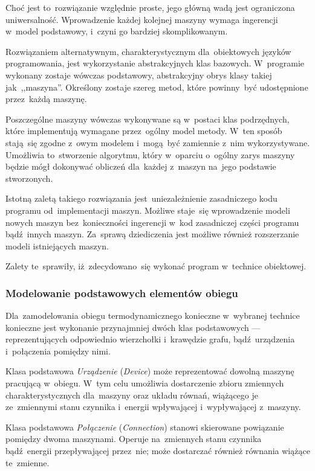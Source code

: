 Choć jest to~rozwiązanie względnie proste, jego główną wadą jest
ograniczona uniwersalność. Wprowadzenie każdej kolejnej maszyny wymaga
ingerencji w~model podstawowy, i~czyni go bardziej skomplikowanym.

Rozwiązaniem alternatywnym, charakterystycznym dla~obiektowych języków
programowania, jest wykorzystanie abstrakcyjnych klas bazowych.
W~programie wykonany zostaje wówczas podstawowy, abstrakcyjny obrys
klasy takiej jak~,,maszyna''. Określony zostaje szereg metod, które
powinny~być udostępnione przez~każdą maszynę.

Poszczególne maszyny wówczas wykonywane są w~postaci klas podrzędnych,
które implementują wymagane przez~ogólny model metody. W~ten sposób
stają~się zgodne z~owym modelem i~mogą~być zamiennie z~nim
wykorzystywane. Umożliwia to~stworzenie algorytmu, który w~oparciu
o~ogólny zarys maszyny będzie mógł dokonywać obliczeń dla~każdej
z~maszyn na~jego podstawie stworzonych.

Istotną zaletą takiego rozwiązania jest~uniezależnienie zasadniczego
kodu programu od~implementacji maszyn. Możliwe staje~się wprowadzenie
modeli nowych maszyn bez~konieczności ingerencji w~kod zasadniczej
części programu bądź~innych maszyn. Za~sprawą dziediczenia jest możliwe
również rozszerzanie modeli istniejących maszyn.

Zalety te~sprawiły, iż~zdecydowano~się wykonać program w~technice
obiektowej.


\subsubsection{Modelowanie podstawowych elementów obiegu}

Dla~zamodelowania obiegu termodynamicznego konieczne w~wybranej technice
konieczne jest wykonanie przynajmniej dwóch klas podstawowych ---
reprezentujących odpowiednio wierzchołki i~krawędzie grafu,
bądź~urządzenia i~połączenia pomiędzy nimi.

Klasa podstawowa \textit{Urządzenie} (\textit{Device}) może
reprezentować dowolną maszynę pracującą w~obiegu. W~tym celu umożliwia
dostarczenie zbioru zmiennych charakterystycznych dla~maszyny oraz
układu równań, wiążącego je ze~zmiennymi stanu czynnika i~energii
wpływającej i~wypływającej z~maszyny.

Klasa podstawowa \textit{Połączenie} (\textit{Connection}) stanowi
skierowane powiązanie pomiędzy dwoma maszynami. Operuje na~zmiennych
stanu czynnika bądź~energii przepływającej przez~nie; może dostarczać
również równania wiążące te~zmienne.

